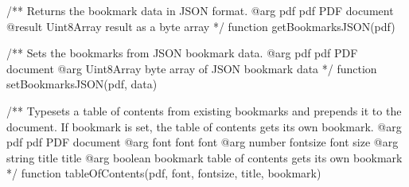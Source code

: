 /** Returns the bookmark data in JSON format.
@arg {pdf} pdf PDF document
@result {Uint8Array} result as a byte array */
function getBookmarksJSON(pdf) {}

/** Sets the bookmarks from JSON bookmark data.
@arg {pdf} pdf PDF document
@arg {Uint8Array} byte array of JSON bookmark data */
function setBookmarksJSON(pdf, data) {}

/** Typesets a table of contents from existing bookmarks and prepends it to
the document. If bookmark is set, the table of contents gets its own
bookmark.
@arg {pdf} pdf PDF document
@arg {font} font font
@arg {number} fontsize font size
@arg {string} title title
@arg {boolean} bookmark table of contents gets its own bookmark */
function tableOfContents(pdf, font, fontsize, title, bookmark) {}

